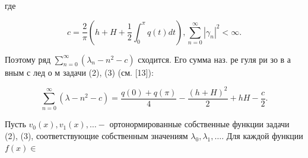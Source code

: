 \documentclass[10pt]{article}
\begin{document}
где



\[

c=\frac{2}{\pi}\left(h+H+\frac{1}{2} \int_{0}^{\pi} q(t) d t\right), \sum_{n=0}^{\infty}\left|\gamma_{n}\right|^{2}<\infty .

\]



Поэтому ряд $\sum_{n=0}^{\infty}\left(\lambda_{n}-n^{2}-c\right)$ сходится. Его сумма наз. ре гуля ри зо в а вным с лед о м задачи (2), (3) (см. [13]):



\[

\sum_{n=0}^{\infty}\left(\lambda-n^{2}-c\right)=\frac{q(0)+q(\pi)}{4}-\frac{(h+H)^{2}}{2}+h H-\frac{c}{2} .

\]



Пусть $v_{0}(x), v_{1}(x), \ldots-$ ортонормированные собственные функции задачи (2), (3), соответствующие собственным значениям $\lambda_{0}, \lambda_{1}, \ldots$. Для каждой функции $f(x) \in$
\end{document}
